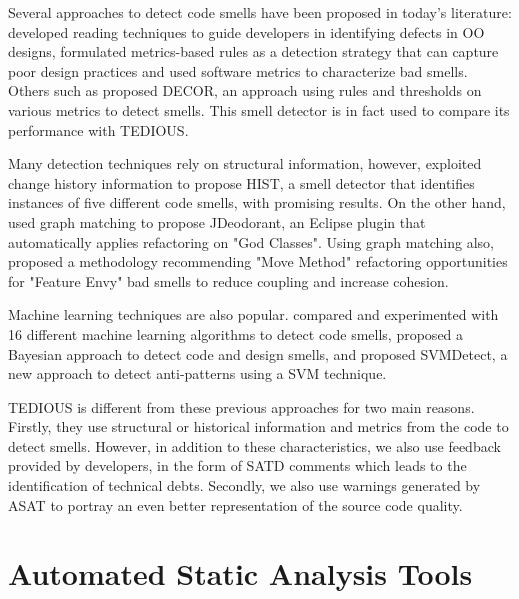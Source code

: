 Several approaches to detect code smells have been proposed in today's literature: \citet{Travassos99-ACM-Inspections} developed reading techniques to guide developers in identifying defects in \ac{OO} designs, \citet{Marinescu04-ICSM-DetectionStrategies} formulated metrics-based rules as a detection strategy that can capture poor design practices and \citet{Munro05-BadSmellIdentification} used software metrics to characterize bad smells. Others such as \citet{moha2010decor} proposed \ac{DECOR}, an approach using rules and thresholds on various metrics to detect smells. This smell detector is in fact used to compare its performance with TEDIOUS. 

Many detection techniques rely on structural information, however, \citet{PalombaBPOPL15} exploited change history information to propose \ac{HIST}, a smell detector that identifies instances of five different code smells, with promising results. On the other hand, \citet{FokaefsTSC11} used graph matching to propose JDeodorant, an Eclipse plugin that automatically applies refactoring on "God Classes". Using graph matching also, \citet{Tsantalis:tse2009} proposed a methodology recommending "Move Method" refactoring opportunities for "Feature Envy" bad smells to reduce coupling and increase cohesion. 

Machine learning techniques are also popular. \citet{fontana2016comparing} compared and experimented with 16 different machine learning algorithms to detect code smells, \citet{khomh2009bayesian} proposed a Bayesian approach to detect code and design smells, and \citet{maiga2012support} proposed SVMDetect, a new approach to detect anti-patterns using a \ac{SVM} technique. \par 

TEDIOUS is different from these previous approaches for two main reasons. Firstly, they use structural or historical information and metrics from the code to detect smells. However, in addition to these characteristics, we also use feedback provided by developers, in the form of \ac{SATD} comments which leads to the identification of technical debts. Secondly, we also use warnings generated by \ac{ASAT} to portray an even better representation of the source code quality. \par 

\section{Automated Static Analysis Tools}

